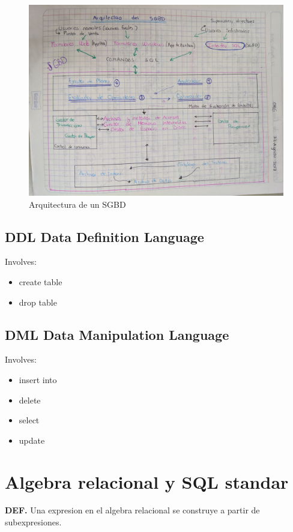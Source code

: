 \documentclass[twoside]{article}
\begin{document}
\begin{figure}[~htb]
  \includegraphics[width=\linewidth]{arqsgbd.jpg}
  \caption{Arquitectura de un SGBD}
\end{figure}

\clearpage

\subsection{DDL Data Definition Language}
Involves:
\begin{itemize}
	\item create table
	\item drop table
\end{itemize}

\subsection{DML Data Manipulation Language}
Involves:
\begin{itemize}
	\item insert into
	\item delete
	\item select
	\item update
\end{itemize}
\section{Algebra relacional y SQL standar}
\textbf{DEF.} Una expresion en el algebra relacional se construye a partir de subexpresiones.\\
\end{document}
